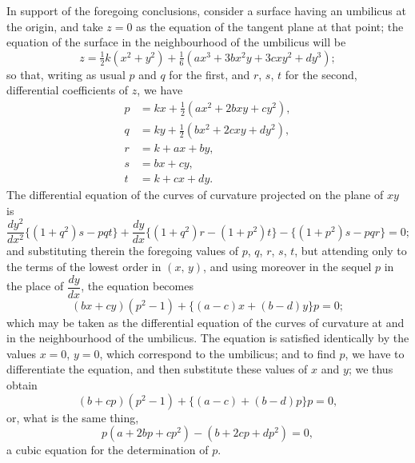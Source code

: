 \documentclass[11pt,a4paper]{article}
\theoremstyle{plain}
\begin{document}
In support of the foregoing conclusions, consider a surface having an umbilicus at the origin, and take $z = 0$ as the equation of the tangent plane at that point; the equation of the surface in the neighbourhood of the umbilicus will be
\[
z = \tfrac{1}{2}k(x^2 + y^2) + \tfrac{1}{6}(a x^3 + 3 b x^2 y + 3 c x y^2 + d y^3);
\]
so that, writing as usual $p$ and $q$ for the first, and $r$, $s$, $t$ for the second, differential coefficients of $z$, we have
\begin{align*}
p &= k x + \tfrac{1}{2}(a x^2 + 2 b x y + c y^2), \\
q &= k y + \tfrac{1}{2}(b x^2 + 2 c x y + d y^2), \\
r &= k + a x + b y, \\
s &= b x + c y, \\
t &= k + c x + d y.
\end{align*}
The differential equation of the curves of curvature projected on the plane of $xy$ is
\[
\frac{dy^2}{dx^2}\{(1 + q^2)s - p q t\} + \frac{dy}{dx}\{(1 + q^2)r - (1 + p^2)t\} - \{(1 + p^2)s - p q r\} = 0;
\]
and substituting therein the foregoing values of $p$, $q$, $r$, $s$, $t$, but attending only to the terms of the lowest order in $(x,\,y)$, and using moreover in the sequel $p$ in the place of $\dfrac{dy}{dx}$, the equation becomes
\[
(b x + c y)(p^2 - 1) + \{(a - c)x + (b - d)y\}p = 0;
\]
which may be taken as the differential equation of the curves of curvature at and in the neighbourhood of the umbilicus. The equation is satisfied identically by the values $x = 0$, $y = 0$, which correspond to the umbilicus; and to find $p$, we have to differentiate the equation, and then substitute these values of $x$ and $y$; we thus obtain
\[
(b + c p)(p^2 - 1) + \{(a - c) + (b - d)p\}p = 0,
\]
or, what is the same thing,
\[
p(a + 2 b p + c p^2) - (b + 2 c p + d p^2) = 0,
\]
a cubic equation for the determination of $p$.
\end{document}
